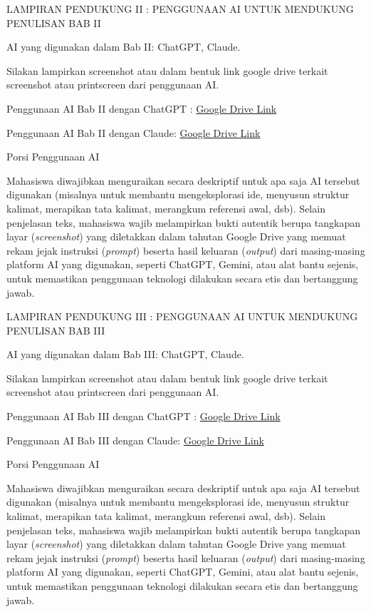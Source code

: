 \textbf{\hfill\break
}

LAMPIRAN PENDUKUNG II : PENGGUNAAN AI UNTUK MENDUKUNG PENULISAN BAB II

AI yang digunakan dalam Bab II: ChatGPT, Claude.

Silakan lampirkan screenshot atau dalam bentuk link google drive terkait
screenshot atau printscreen dari penggunaan AI.

Penggunaan AI Bab II dengan ChatGPT :
\href{file:///D:/01\%20Data/111\%20KK\%20DIGEST/49\%20Template\%20dan\%20panduan/2026/link\%20drive\%20google}{Google
Drive Link}

Penggunaan AI Bab II dengan Claude:
\href{file:///D:/01\%20Data/111\%20KK\%20DIGEST/49\%20Template\%20dan\%20panduan/2026/link\%20drive\%20google}{Google
Drive Link}

Porsi Penggunaan AI

Mahasiswa diwajibkan menguraikan secara deskriptif untuk apa saja AI
tersebut digunakan (misalnya untuk membantu mengeksplorasi ide, menyusun
struktur kalimat, merapikan tata kalimat, merangkum referensi awal,
dsb). Selain penjelasan teks, mahasiswa wajib melampirkan bukti autentik
berupa tangkapan layar (\emph{screenshot}) yang diletakkan dalam tahutan
Google Drive yang memuat rekam jejak instruksi (\emph{prompt}) beserta
hasil keluaran (\emph{output}) dari masing-masing platform AI yang
digunakan, seperti ChatGPT, Gemini, atau alat bantu sejenis, untuk
memastikan penggunaan teknologi dilakukan secara etis dan bertanggung
jawab.

\textbf{\hfill\break
}

LAMPIRAN PENDUKUNG III : PENGGUNAAN AI UNTUK MENDUKUNG PENULISAN BAB III

AI yang digunakan dalam Bab III: ChatGPT, Claude.

Silakan lampirkan screenshot atau dalam bentuk link google drive terkait
screenshot atau printscreen dari penggunaan AI.

Penggunaan AI Bab III dengan ChatGPT :
\href{file:///D:/01\%20Data/111\%20KK\%20DIGEST/49\%20Template\%20dan\%20panduan/2026/link\%20drive\%20google}{Google
Drive Link}

Penggunaan AI Bab III dengan Claude:
\href{file:///D:/01\%20Data/111\%20KK\%20DIGEST/49\%20Template\%20dan\%20panduan/2026/link\%20drive\%20google}{Google
Drive Link}

Porsi Penggunaan AI

Mahasiswa diwajibkan menguraikan secara deskriptif untuk apa saja AI
tersebut digunakan (misalnya untuk membantu mengeksplorasi ide, menyusun
struktur kalimat, merapikan tata kalimat, merangkum referensi awal,
dsb). Selain penjelasan teks, mahasiswa wajib melampirkan bukti autentik
berupa tangkapan layar (\emph{screenshot}) yang diletakkan dalam tahutan
Google Drive yang memuat rekam jejak instruksi (\emph{prompt}) beserta
hasil keluaran (\emph{output}) dari masing-masing platform AI yang
digunakan, seperti ChatGPT, Gemini, atau alat bantu sejenis, untuk
memastikan penggunaan teknologi dilakukan secara etis dan bertanggung
jawab.
